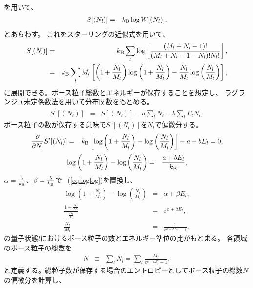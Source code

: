\documentclass[12pt,a4paper]{jbook}
\newcommand{\kb} {k_{\rm B}}				%
\begin{document}
        	を用いて、
		\begin{eqnarray}
			S[(N_l)] & = & \kb \log W[(N_l)],
		\end{eqnarray}
        	とあらわす。
        	これをスターリングの近似式を用いて、
		\begin{eqnarray}
			S[(N_l)] & = & \kb \sum_l \log
			\left[
				\frac{(M_l+N_l-1)!}{(M_l+N_l-1-N_l)!N_l!}
			\right], \nonumber
			\\
			& = & \kb \sum_l M_l
			\left[
				\left(1 + \frac{N_l}{M_l}\right)
				\log \left(1 + \frac{N_l}{M_l}\right)
				- \frac{N_l}{M_l} \log \left( \frac{N_l}{M_l}\right)
			\right],
		\end{eqnarray}
		に展開できる。ボース粒子総数とエネルギーが保存することを想定し、
        	ラグランジュ未定係数法を用いて分布関数をもとめる。
		\begin{eqnarray}
			S^\prime [(N_l )] & = & S[( N_l )] - a \sum_l N_l - b \sum_l E_l N_l,
		\end{eqnarray}
        	ボース粒子の数が保存する意味で$S^\prime [(N_l )]$を$N_l$で偏微分する。
		\begin{eqnarray}
			\frac{\partial}{\partial N_l}S^\prime [(N_l )] & = &
			\kb
			\left[
			\log \left(1 + \frac{N_l}{M_l} \right) - \log \left( \frac{N_l}{M_l} \right)
			\right] - a - b E_l = 0,
		\end{eqnarray}
		\begin{eqnarray}
            	\label{eq:loglog}
			\log \left(1 + \frac{N_l}{M_l} \right) - \log \left( \frac{N_l}{M_l} \right)
			& = & \frac{a + b E_l}{\kb},
		\end{eqnarray}
		$\alpha = \frac{a}{\kb}$、$\beta = \frac{b}{\kb}$で
		~(\ref{eq:loglog})を置換し、
		\begin{eqnarray}
            	\label{eq:logratio}
			\log \left(1 + \frac{N_l}{M_l} \right) - \log \left( \frac{N_l}{M_l} \right)
			& = & \alpha + \beta E_l,
			\\
			\frac{1+\frac{N_l}{M_l}}{\frac{N_l}{M_l}} & = & e^{\alpha + \beta E_l}, \nonumber
			\\
            	\label{eq:nlml}
			\frac{N_l}{M_l} & = & \frac{1}{e^{\alpha + \beta E_l} -1},
		\end{eqnarray}
        	の量子状態$l$におけるボース粒子の数とエネルギー準位の比がもとまる。
        	各領域のボース粒子の総数を
		\begin{eqnarray}
			N & \equiv & \sum_l N_l = \sum_l \frac{M_l}{e^{\alpha + \beta E_l} -1},
		\end{eqnarray}
        	と定義する。総粒子数が保存する場合のエントロピーとしてボース粒子の総数$N$の偏微分を計算し、
\end{document}
